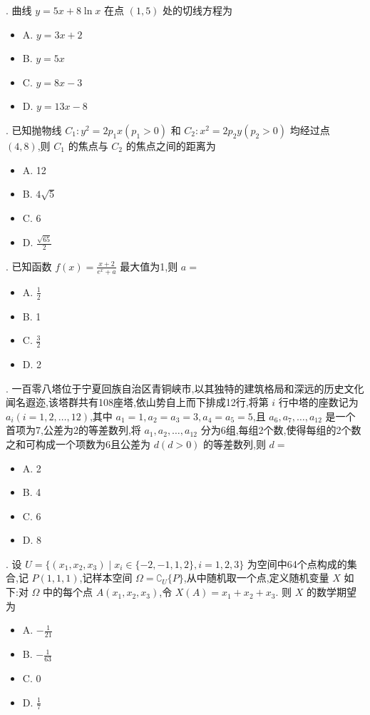 \documentclass[UTF8, a4paper, 11pt]{ctexart}
\begin{document}
. 曲线 $y=5x+8\ln x$ 在点 $(1,5)$ 处的切线方程为
\begin{itemize}
    \item A. $y=3x+2$
    \item B. $y=5x$
    \item C. $y=8x-3$
    \item D. $y=13x-8$
\end{itemize}

. 已知抛物线 $C_{1}:y^{2}=2p_{1}x(p_{1}>0)$ 和 $C_{2}:x^{2}=2p_{2}y(p_{2}>0)$ 均经过点 $(4,8)$,则 $C_{1}$ 的焦点与 $C_{2}$ 的焦点之间的距离为
\begin{itemize}
    \item A. 12
    \item B. $4\sqrt{5}$
    \item C. 6
    \item D. $\frac{\sqrt{65}}{2}$
\end{itemize}

. 已知函数 $f(x)=\frac{x+2}{e^{x}+a}$ 最大值为1,则 $a=$
\begin{itemize}
    \item A. $\frac{1}{2}$
    \item B. 1
    \item C. $\frac{3}{2}$
    \item D. 2
\end{itemize}

. 一百零八塔位于宁夏回族自治区青铜峡市,以其独特的建筑格局和深远的历史文化闻名遐迩,该塔群共有108座塔,依山势自上而下排成12行,将第 $i$ 行中塔的座数记为 $a_{i}(i=1,2,\dots,12)$,其中 $a_{1}=1,a_{2}=a_{3}=3,a_{4}=a_{5}=5$,且 $a_{6},a_{7},\dots,a_{12}$ 是一个首项为7,公差为2的等差数列,将 $a_{1},a_{2},\dots,a_{12}$ 分为6组,每组2个数,使得每组的2个数之和可构成一个项数为6且公差为 $d(d>0)$ 的等差数列,则 $d=$
\begin{itemize}
    \item A. 2
    \item B. 4
    \item C. 6
    \item D. 8
\end{itemize}

. 设 $U=\{(x_{1},x_{2},x_{3}) \mid x_{i}\in\{-2,-1,1,2\},i=1,2,3\}$ 为空间中64个点构成的集合,记 $P(1,1,1)$,记样本空间 $\Omega=\complement_{U}\{P\}$,从中随机取一个点,定义随机变量 $X$ 如下:对 $\Omega$ 中的每个点 $A(x_{1},x_{2},x_{3})$,令 $X(A)=x_{1}+x_{2}+x_{3}.$ 则 $X$ 的数学期望为
\begin{itemize}
    \item A. $-\frac{1}{21}$
    \item B. $-\frac{1}{63}$
    \item C. 0
    \item D. $\frac{1}{7}$
\end{itemize}
\end{document}
